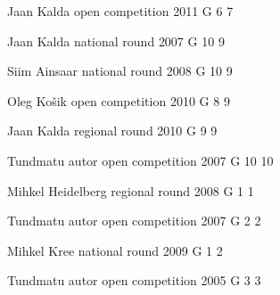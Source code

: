 \documentclass[11pt]{article}
\begin{document}
\ylDisplay{} %
{Jaan Kalda} %
{open competition} %
{2011} %
{G 6} %
{7} %
{

\ifEngSolution
\fi
}

\ylDisplay{} %
{Jaan Kalda} %
{national round} %
{2007} %
{G 10} %
{9} %
{

\ifEngSolution
\fi
}

\ylDisplay{} %
{Siim Ainsaar} %
{national round} %
{2008} %
{G 10} %
{9} %
{

\ifEngSolution
\fi
}

\ylDisplay{} %
{Oleg Košik} %
{open competition} %
{2010} %
{G 8} %
{9} %
{

\ifEngSolution
\fi
}

\ylDisplay{} %
{Jaan Kalda} %
{regional round} %
{2010} %
{G 9} %
{9} %
{

\ifEngSolution
\fi
}

\ylDisplay{} %
{Tundmatu autor} %
{open competition} %
{2007} %
{G 10} %
{10} %
{

\ifEngSolution
\fi
}

\ylDisplay{} %
{Mihkel Heidelberg} %
{regional round} %
{2008} %
{G 1} %
{1} %
{

\ifEngSolution
\fi
}

\ylDisplay{} %
{Tundmatu autor} %
{open competition} %
{2007} %
{G 2} %
{2} %
{

\ifEngSolution
\fi
}

\ylDisplay{} %
{Mihkel Kree} %
{national round} %
{2009} %
{G 1} %
{2} %
{

\ifEngSolution
\fi
}

\ylDisplay{} %
{Tundmatu autor} %
{open competition} %
{2005} %
{G 3} %
{3} %
{

\ifEngSolution
\fi
}
\end{document}
